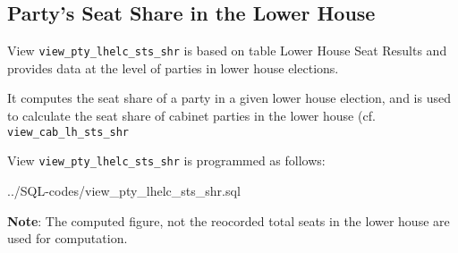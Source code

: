 \subsection{Party's Seat Share in the Lower House}\label{view_pty_lhelc_sts_shr}
View \texttt{\footnotesize view\_pty\_lhelc\_sts\_shr} is based on table Lower House Seat Results and provides data at the level of parties in lower house elections.

It computes the seat share of a party in a given lower house election, and is used to calculate the seat share of cabinet parties in the lower house (cf.  \texttt{\footnotesize view\_cab\_lh\_sts\_shr}

View \texttt{\footnotesize view\_pty\_lhelc\_sts\_shr} is programmed as follows:

%
{../SQL-codes/view_pty_lhelc_sts_shr.sql}


{\bf Note}: The computed figure, not the reocorded total seats in the lower house are used for computation.


